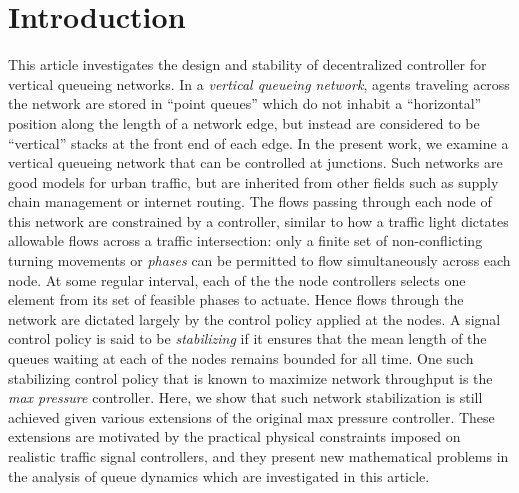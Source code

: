 \section{Introduction}

This article investigates the design and stability of decentralized controller for vertical queueing networks. In a \emph{vertical queueing network}, agents traveling across the network are stored in ``point queues'' which do not inhabit a ``horizontal'' position along the length of a network edge, but instead are considered to be ``vertical'' stacks at the front end of each edge. In the present work, we examine a vertical queueing network that can be controlled at junctions. Such networks are good models for urban traffic, but are inherited from other fields such as supply chain management or internet routing.
 The flows passing through each node of this network are constrained by a controller, similar to how a traffic light dictates allowable flows across a traffic intersection: only a finite set of non-conflicting turning movements or \emph{phases} can be permitted to flow simultaneously across each node. 
At some regular interval, each of the the node controllers selects one element from its set of feasible phases to actuate. Hence flows through the network are dictated largely by the control policy applied at the nodes. A signal control policy is said to be \emph{stabilizing} if it ensures that the mean length of the queues waiting at each of the nodes remains bounded for all time. One such stabilizing control policy that is known to maximize network throughput is the \emph{max pressure} controller. Here, we show that such network stabilization is still achieved given various extensions of the original max pressure controller. These extensions are motivated by the practical physical constraints imposed on realistic traffic signal controllers, and they present new mathematical problems in the analysis of queue dynamics which are investigated in this article. 




